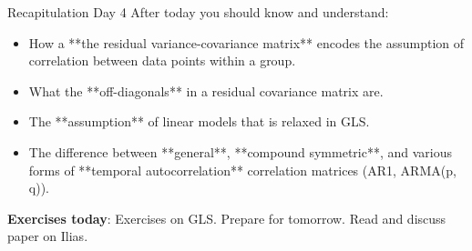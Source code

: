 \documentclass{beamer}
\begin{document}
\begin{frame}{Recapitulation Day 4}
  After today you should know and understand:
  \begin{itemize}
    \item How a **the residual variance-covariance matrix** encodes the assumption of correlation between data points within a group.
    \item What the **off-diagonals** in a residual covariance matrix are.
    \item The **assumption** of linear models that is relaxed in GLS.
    \item The difference between **general**, **compound symmetric**, and various forms of **temporal autocorrelation** correlation matrices (AR1, ARMA(p, q)).
  \end{itemize}
  \textbf{Exercises today}: Exercises on GLS. Prepare for tomorrow. Read and discuss paper on Ilias.
\end{frame}
\end{document}
